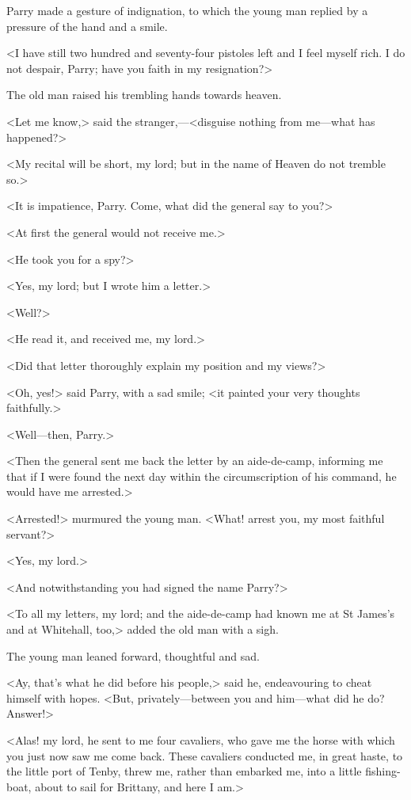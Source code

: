 Parry made a gesture of indignation, to which the young man replied by a pressure of the hand and a smile.

<I have still two hundred and seventy-four pistoles left and I feel myself rich. I do not despair, Parry; have you faith in my resignation?>

The old man raised his trembling hands towards heaven.

<Let me know,> said the stranger,—<disguise nothing from me—what has happened?>

<My recital will be short, my lord; but in the name of Heaven do not tremble so.>

<It is impatience, Parry. Come, what did the general say to you?>

<At first the general would not receive me.>

<He took you for a spy?>

<Yes, my lord; but I wrote him a letter.>

<Well?>

<He read it, and received me, my lord.>

<Did that letter thoroughly explain my position and my views?>

<Oh, yes!> said Parry, with a sad smile; <it painted your very thoughts faithfully.>

<Well—then, Parry.>

<Then the general sent me back the letter by an aide-de-camp, informing me that if I were found the next day within the circumscription of his command, he would have me arrested.>

<Arrested!> murmured the young man. <What! arrest you, my most faithful servant?>

<Yes, my lord.>

<And notwithstanding you had signed the name Parry?>

<To all my letters, my lord; and the aide-de-camp had known me at St James's and at Whitehall, too,> added the old man with a sigh.

The young man leaned forward, thoughtful and sad.

<Ay, that's what he did before his people,> said he, endeavouring to cheat himself with hopes. <But, privately—between you and him—what did he do? Answer!>

<Alas! my lord, he sent to me four cavaliers, who gave me the horse with which you just now saw me come back. These cavaliers conducted me, in great haste, to the little port of Tenby, threw me, rather than embarked me, into a little fishing-boat, about to sail for Brittany, and here I am.>

